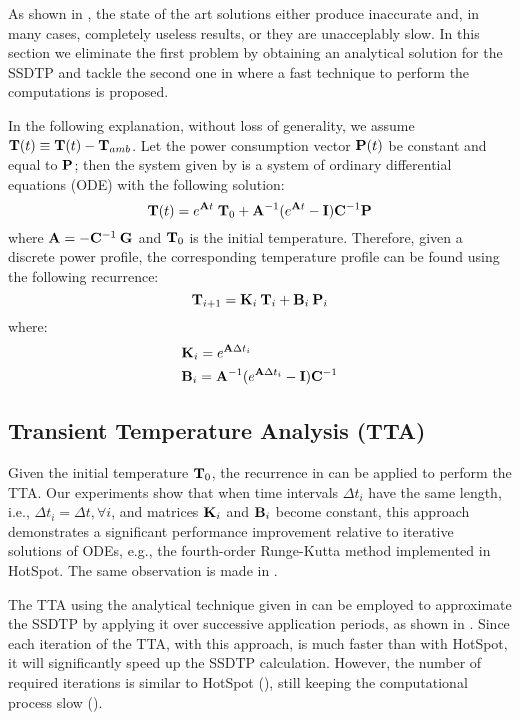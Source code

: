As shown in , the state of the art solutions either produce inaccurate and, in many cases, completely useless results, or they are unacceplably slow. In this section we eliminate the first problem by obtaining an analytical solution for the SSDTP and tackle the second one in  where a fast technique to perform the computations is proposed.

In the following explanation, without loss of generality, we assume $\mathbf{T}(t) \equiv \mathbf{T}(t) - \mathbf{T}_{amb}$. Let the power consumption vector $\mathbf{P}(t)$ be constant and equal to $\mathbf{P}$; then the system given by  is a system of ordinary differential equations (ODE) with the following solution:
\begin{equation} \label{eq:solution}
  \mathbf{T}(t) = e^{\mathbf{A} t} \; \mathbf{T}_0 + \mathbf{A}^{-1}(e^{\mathbf{A} t} - \mathbf{I})\mathbf{C}^{-1} \mathbf{P}
\end{equation}
where $\mathbf{A} = -\mathbf{C}^{-1} \: \mathbf{G}$ and $\mathbf{T}_0$ is the initial temperature. Therefore, given a discrete power profile, the corresponding temperature profile can be found using the following recurrence:
\begin{equation} \label{eq:recurrent-system}
  \mathbf{T}_{i+1} = \mathbf{K}_i \: \mathbf{T}_i + \mathbf{B}_i \: \mathbf{P}_i
\end{equation}
where:
\begin{align*}
  & \mathbf{K}_i = e^{\mathbf{A} \Delta t_i} \\
  & \mathbf{B}_i = \mathbf{A}^{-1}(e^{\mathbf{A} \Delta t_i} - \mathbf{I})\mathbf{C}^{-1}
\end{align*}

\subsection{Transient Temperature Analysis (TTA)} \label{sec:tta-analytical}
Given the initial temperature $\mathbf{T}_0$, the recurrence in  can be applied to perform the TTA. Our experiments show that when time intervals $\Delta t_i$ have the same length, i.e., $\Delta t_i = \Delta t, \forall i$, and matrices $\mathbf{K}_i$ and $\mathbf{B}_i$ become constant, this approach demonstrates a significant performance improvement relative to iterative solutions of ODEs, e.g., the fourth-order Runge-Kutta method implemented in HotSpot. The same observation is made in \cite{thiele2011}.

The TTA using the analytical technique given in  can be employed to approximate the SSDTP by applying it over successive application periods, as shown in . Since each iteration of the TTA, with this approach, is much faster than with HotSpot, it will significantly speed up the SSDTP calculation. However, the number of required iterations is similar to HotSpot (), still keeping the computational process slow ().

